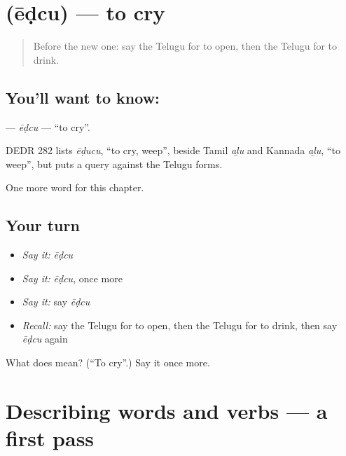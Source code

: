 \section[\texorpdfstring{\te{ఏడ్చు} (ēḍcu)}{ఏడ్చు (ēḍcu)}]{ (ēḍcu) — to cry}

\label{lesson:TE-C149-edcu}



\begin{quote}
Before the new one: say the Telugu for to open, then the Telugu for to drink.
\end{quote}

\subsection*{You'll want to know: }
\textbf{} — \emph{ēḍcu} — \textquotedblleft{}to cry\textquotedblright{}.

\begin{cousinweb}
DEDR 282 lists \emph{ēḍucu}, \textquotedblleft{}to cry, weep\textquotedblright{}, beside Tamil \emph{aḻu} and Kannada \emph{aḻu}, \textquotedblleft{}to weep\textquotedblright{}, but puts a query against the Telugu forms.
\end{cousinweb}

\begin{grammarlens}[title={What you've built}]
One more word for this chapter.
\end{grammarlens}

\subsection*{Your turn}
\begin{itemize}
\raggedright
  \item \emph{Say it:} \emph{ēḍcu}
  \item \emph{Say it:} \emph{ēḍcu}, once more
  \item \emph{Say it:} say \emph{ēḍcu}
  \item \emph{Recall:} say the Telugu for to open, then the Telugu for to drink, then say \emph{ēḍcu} again
\end{itemize}

\begin{tcolorbox}[breakable,colback=teal!4,colframe=teal!35!black,title={Before you move on}]
What does  mean? (\textquotedblleft{}To cry\textquotedblright{}.) Say it once more.
\end{tcolorbox}
\section[(dialogue)]{Describing words and verbs — a first pass}

